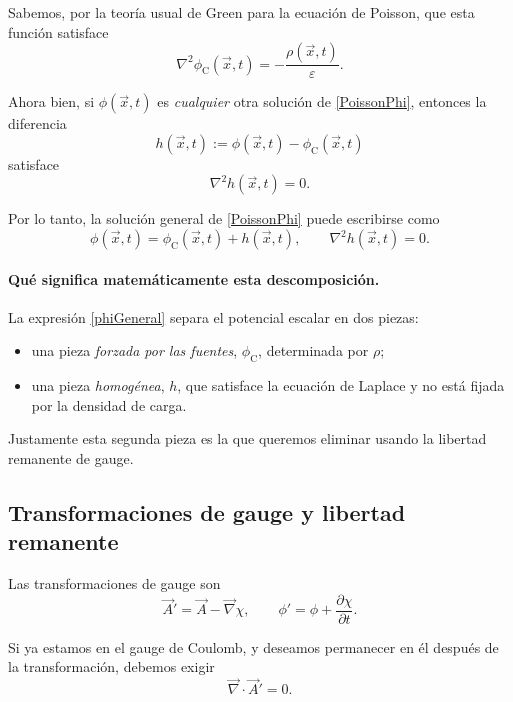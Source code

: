\documentclass{article}
\numberwithin{equation}{section}
\newcommand{\grad}{\vec\nabla}
\newcommand{\A}{\vec A}
\newcommand{\x}{\vec x}
\newcommand{\eps}{\varepsilon}
\begin{document}
Sabemos, por la teoría usual de Green para la ecuación de Poisson, que esta función satisface
\begin{equation}
\nabla^2\phi_{\mathrm C}(\x,t)=-\frac{\rho(\x,t)}{\eps}.
\end{equation}

Ahora bien, si $\phi(\x,t)$ es \emph{cualquier} otra solución de \eqref{PoissonPhi}, entonces la diferencia
\begin{equation}
 h(\x,t):=\phi(\x,t)-\phi_{\mathrm C}(\x,t)
\end{equation}
satisface
\begin{equation}\label{Laplaceh}
\nabla^2 h(\x,t)=0.
\end{equation}

Por lo tanto, la solución general de \eqref{PoissonPhi} puede escribirse como
\begin{equation}\label{phiGeneral}
\phi(\x,t)=\phi_{\mathrm C}(\x,t)+h(\x,t),
\qquad \nabla^2 h(\x,t)=0.
\end{equation}


\paragraph{Qué significa matemáticamente esta descomposición.}
La expresión \eqref{phiGeneral} separa el potencial escalar en dos piezas:
\begin{itemize}[leftmargin=1.5em]
    \item una pieza \emph{forzada por las fuentes}, $\phi_{\mathrm C}$, determinada por $\rho$;
    \item una pieza \emph{homogénea}, $h$, que satisface la ecuación de Laplace y no está fijada por la densidad de carga.
\end{itemize}
Justamente esta segunda pieza es la que queremos eliminar usando la libertad remanente de gauge.


\subsection{Transformaciones de gauge y libertad remanente}

Las transformaciones de gauge son
\begin{equation}\label{GaugeTransf}
\A' = \A-\grad\chi,
\qquad
\phi'=\phi+\frac{\partial\chi}{\partial t}.
\end{equation}

Si ya estamos en el gauge de Coulomb, y deseamos permanecer en él después de la transformación, debemos exigir
\begin{equation}
\grad\cdot\A'=0.
\end{equation}
\end{document}
